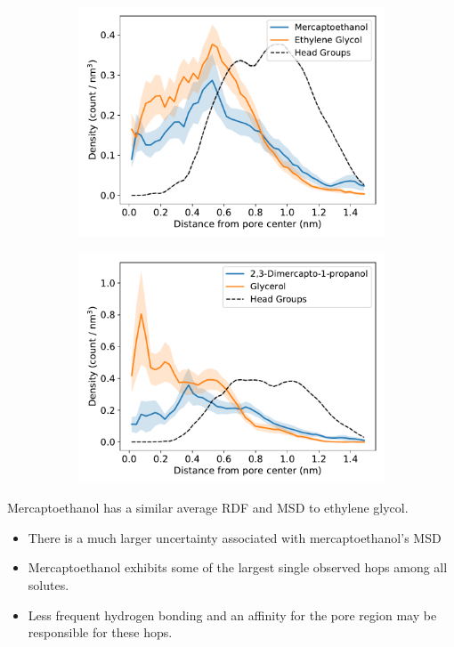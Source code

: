 \documentclass{article}
\begin{document}
  \begin{figure}
  \centering
  \begin{subfigure}{0.45\linewidth}
  \includegraphics[width=\textwidth]{thiol_comparison_SOH.pdf}
  \caption{}\label{fig:SOH_GCL_comparison}
  \end{subfigure}
  \begin{subfigure}{0.45\linewidth}
  \includegraphics[width=\textwidth]{thiol_comparison_DMP.pdf}
  \caption{}\label{fig:DMP_GLY_comparison}
  \end{subfigure}
  \caption{}\label{fig:sulfur_analog_rdfs}
  \end{figure}
  
  \noindent Mercaptoethanol has a similar average RDF and MSD to ethylene glycol.
  \begin{itemize}
    \item There is a much larger uncertainty associated with mercaptoethanol's MSD
    \item Mercaptoethanol exhibits some of the largest single observed hops among all solutes.
    \item Less frequent hydrogen bonding and an affinity for the pore region may be responsible
    for these hops.
  \end{itemize}
  
\end{document}

